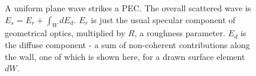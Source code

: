 \documentclass{article}
\numberwithin{equation}{section}
\begin{document}
\begin{figure}[H]
\begin{center}
            \caption{A uniform plane wave strikes a PEC. The overall scattered wave is
            $E_s = E_r + \int_W d E_d$. $E_r$ is just the usual specular component of
            geometrical optics, multiplied by $R$, a roughness parameter. $E_d$ is the
            diffuse component - a sum of non-coherent contributions along the wall, one
            of which is shown here, for a drawn surface element $dW$.}
            \label{fig:planeWavePEC}
            \end{center}
            \end{figure}
\end{document}
